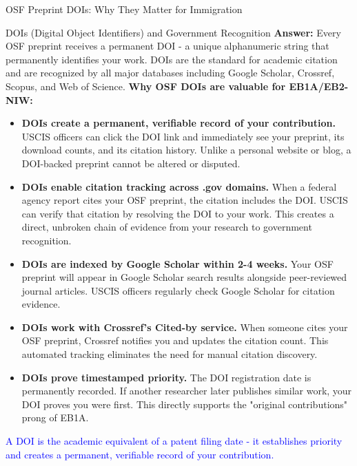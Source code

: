 \documentclass[11pt]{beamer}
\begin{document}
	\begin{frame}{OSF Preprint DOIs: Why They Matter for Immigration}
		\scriptsize
		\begin{block}{DOIs (Digital Object Identifiers) and Government Recognition}
			\textbf{Answer:} Every OSF preprint receives a permanent DOI - a unique alphanumeric string that permanently identifies your work. DOIs are the standard for academic citation and are recognized by all major databases including Google Scholar, Crossref, Scopus, and Web of Science.
			\vspace{0.1cm}
			\textbf{Why OSF DOIs are valuable for EB1A/EB2-NIW:}
			\begin{itemize}
				\item \textbf{DOIs create a permanent, verifiable record of your contribution.} USCIS officers can click the DOI link and immediately see your preprint, its download counts, and its citation history. Unlike a personal website or blog, a DOI-backed preprint cannot be altered or disputed.
				\item \textbf{DOIs enable citation tracking across .gov domains.} When a federal agency report cites your OSF preprint, the citation includes the DOI. USCIS can verify that citation by resolving the DOI to your work. This creates a direct, unbroken chain of evidence from your research to government recognition.
				\item \textbf{DOIs are indexed by Google Scholar within 2-4 weeks.} Your OSF preprint will appear in Google Scholar search results alongside peer-reviewed journal articles. USCIS officers regularly check Google Scholar for citation evidence.
				\item \textbf{DOIs work with Crossref's Cited-by service.} When someone cites your OSF preprint, Crossref notifies you and updates the citation count. This automated tracking eliminates the need for manual citation discovery.
				\item \textbf{DOIs prove timestamped priority.} The DOI registration date is permanently recorded. If another researcher later publishes similar work, your DOI proves you were first. This directly supports the "original contributions" prong of EB1A.
			\end{itemize}
			\textcolor{blue}{A DOI is the academic equivalent of a patent filing date - it establishes priority and creates a permanent, verifiable record of your contribution.}
		\end{block}
	\end{frame}
	
\end{document}
